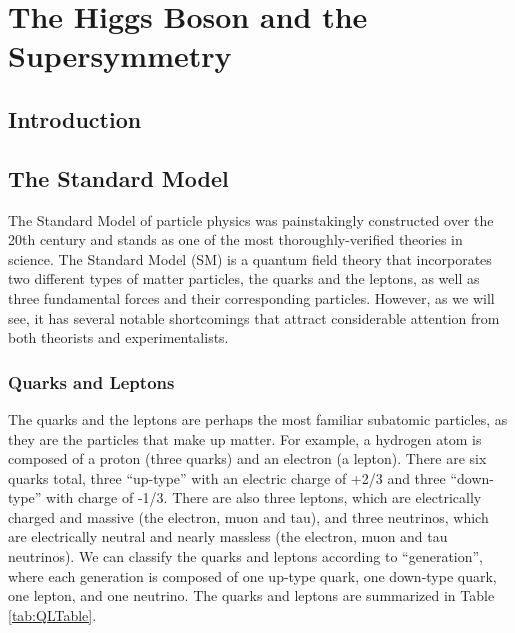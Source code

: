  

\chapter[Theory]{The Higgs Boson and the Supersymmetry}
\label{chapter:Theory}



\section{Introduction}


\section{The Standard Model}
The Standard Model of particle physics was painstakingly constructed over the 20th century and stands as one of the most thoroughly-verified theories in science.  The Standard Model (SM) is a quantum field theory that incorporates two different types of matter particles, the quarks and the leptons, as well as three fundamental forces and their corresponding particles.  However, as we will see, it has several notable shortcomings that attract considerable attention from both theorists and experimentalists.  

\subsection{Quarks and Leptons}
The quarks and the leptons are perhaps the most familiar subatomic particles, as they are the particles that make up matter.  For example, a hydrogen atom is composed of a proton (three quarks) and an electron (a lepton).  There are six quarks total, three ``up-type'' with an electric charge of +2/3 and three ``down-type'' with charge of -1/3.  There are also three leptons, which are electrically charged and massive (the electron, muon and tau), and three neutrinos, which are electrically neutral and nearly massless (the electron, muon and tau neutrinos).  We can classify the quarks and leptons according to ``generation'', where each generation is composed of one up-type quark, one down-type quark, one lepton, and one neutrino.  The quarks and leptons are summarized in Table \ref{tab:QLTable}.


